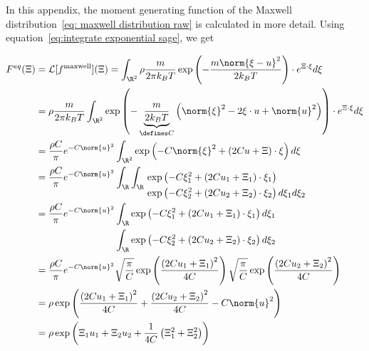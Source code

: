 In this appendix, the moment generating function of the Maxwell distribution~\eqref{eq: maxwell distribution raw} is calculated in more detail.
Using equation~\eqref{eq:integrate exponential sage}, we get

\begin{equation*}
  \begin{aligned}
    F^{eq}(\Xi) & = \mathcal{L}[f^{\text{maxwell}}](\Xi)
    = \int_{\R^2} \rho \frac{m}{2\pi k_B T} \exp \left( - \frac{m\norm{\xi-u}^2}{2 k_B T}\right) \cdot e^{\Xi\cdot\xi} d\xi \\
    & = \rho  \frac{m}{2\pi k_B T} \int_{\R^2}
      \exp \left( - \underbrace{\frac{m}{2 k_B T}}_{\defines C} \left( \norm{\xi}^2 - 2\xi\cdot u + \norm{u}^2 \right)\right) \cdot e^{\Xi\cdot\xi} d\xi \\
    & = \frac{\rho C} {\pi} e^{-C \norm{u}^2}
      \int_{\R^2}
      \exp \left( - C\norm{\xi}^2 + (2Cu + \Xi)\cdot\xi \right) d\xi \\
    & =  \frac{\rho C} {\pi} e^{-C \norm{u}^2}
      \int_{\R} \int_{\R}
      \begin{aligned}[t]
      &\exp \left( - C \xi_1^2 + (2Cu_1 + \Xi_1)\cdot\xi_1 \right) \\
      &\exp \left( - C\xi_2^2 + (2Cu_2 + \Xi_2)\cdot\xi_2 \right) d\xi_1 d\xi_2
      \end{aligned}\\
    & = \frac{\rho C} {\pi} e^{-C \norm{u}^2}
      \begin{aligned}[t]
        &\int_{\R}
        \exp \left( - C\xi_1^2 + (2Cu_1 + \Xi_1)\cdot\xi_1 \right) d\xi_1 \\
        &\int_{\R}
        \exp \left( - C\xi_2^2 + (2Cu_2 + \Xi_2)\cdot\xi_2 \right) d\xi_2
      \end{aligned}\\
    & = \frac{\rho C} {\pi} e^{-C \norm{u}^2}
      \sqrt{\frac{\pi}{C}}\exp \left( \frac{{(2Cu_1 + \Xi_1)}^2}{4C}\right)
      \sqrt{\frac{\pi}{C}}\exp \left( \frac{{(2Cu_2 + \Xi_2)}^2}{4C}\right) \\
    & = \rho
      \exp \left( \frac{{(2Cu_1 + \Xi_1)}^2}{4C} + \frac{{(2Cu_2 + \Xi_2)}^2}{4C} -C \norm{u}^2 \right) \\
    & = \rho
      \exp \left( \Xi_1 u_1 + \Xi_2 u_2 + \frac{1}{4C}\left(\Xi_1^2 + \Xi_2^2 \right)\right)
  \end{aligned}
\end{equation*}
